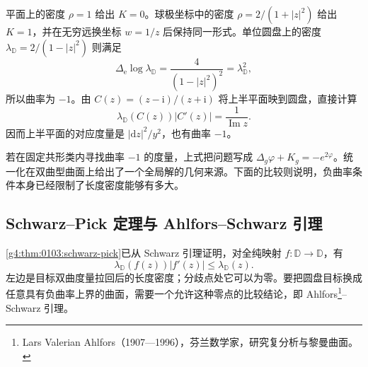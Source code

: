 \begin{example}
	\label{g4:exm:0504:three-curvatures}
	平面上的密度 \(\rho=1\) 给出 \(K=0\)。球极坐标中的密度 \(\rho=2/(1+|z|^2)\) 给出 \(K=1\)，并在无穷远换坐标 \(w=1/z\) 后保持同一形式。单位圆盘上的密度 \(\lambda_{\mathbb D}=2/(1-|z|^2)\) 则满足
	\[
		\Delta_{\mathrm e}\log\lambda_{\mathbb D}
		=\frac4{(1-|z|^2)^2}=\lambda_{\mathbb D}^2,
	\]
	所以曲率为 \(-1\)。由 \(C(z)=(z-\mathrm{i})/(z+\mathrm{i})\) 将上半平面映到圆盘，直接计算
	\[
		\lambda_{\mathbb D}(C(z))|C'(z)|=\frac1{\operatorname{Im}z}.
	\]
	因而上半平面的对应度量是 \(|\mathrm{d}z|^2/y^2\)，也有曲率 \(-1\)。
\end{example}

若在固定共形类内寻找曲率 \(-1\) 的度量，上式把问题写成 \(\Delta_g\varphi+K_g=-e^{2\varphi}\)。统一化在双曲型曲面上给出了一个全局解的几何来源。下面的比较则说明，负曲率条件本身已经限制了长度密度能够有多大。

\subsection{Schwarz–Pick 定理与 Ahlfors–Schwarz 引理}
\label{g4:subsec:0504:02}

\cref{g4:thm:0103:schwarz-pick}已从 Schwarz 引理证明，对全纯映射 \(f:\mathbb D\to\mathbb D\)，有
\[
	\lambda_{\mathbb D}(f(z))|f'(z)|\le\lambda_{\mathbb D}(z).
\]
左边是目标双曲度量拉回后的长度密度；分歧点处它可以为零。要把圆盘目标换成任意具有负曲率上界的曲面，需要一个允许这种零点的比较结论，即 Ahlfors\footnote{Lars Valerian Ahlfors（1907—1996），芬兰数学家，研究复分析与黎曼曲面。}--Schwarz 引理。

